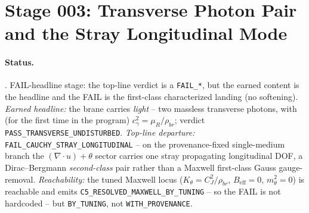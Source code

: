 \section{Stage 003: Transverse Photon Pair and the Stray Longitudinal Mode}

\claimstatus{\StatusOpen}

\paragraph{Status.}
\StatusOpen. FAIL-headline stage: the top-line verdict is a \texttt{FAIL\_*}, but
the earned content is the headline and the FAIL is the first-class characterized
landing (no softening). \emph{Earned headline:} the brane carries \emph{light} --
two massless transverse photons, with (for the first time in the program)
\(c_\gamma^2=\mu_R/\rho_{br}\); verdict \texttt{PASS\_TRANSVERSE\_UNDISTURBED}.
\emph{Top-line departure:} \texttt{FAIL\_CAUCHY\_STRAY\_LONGITUDINAL} -- on the
provenance-fixed single-medium branch the \((\nabla\!\cdot\!u)+\theta\) sector
carries one stray propagating longitudinal DOF, a Dirac--Bergmann
\emph{second-class} pair rather than a Maxwell first-class Gauss gauge-removal.
\emph{Reachability:} the tuned Maxwell locus (\(K_\theta=C_J^2/\rho_{br}\),
\(B_{\mathrm{eff}}=0\), \(m_\theta^2=0\)) is reachable and emits
\texttt{C5\_RESOLVED\_MAXWELL\_BY\_TUNING} -- so the FAIL is not hardcoded -- but
\texttt{BY\_TUNING}, not \texttt{WITH\_PROVENANCE}.

